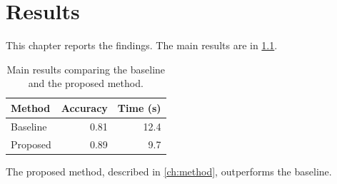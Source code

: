 \chapter{Results}
\label{ch:results}

This chapter reports the findings. The main results are in \cref{tab:results-main}.

\begin{table}[ht]
  \centering
  \begin{tabular}{lrr}
    \toprule
    Method & Accuracy & Time (s) \\
    \midrule
    Baseline & 0.81 & 12.4 \\
    Proposed & 0.89 &  9.7 \\
    \bottomrule
  \end{tabular}
  \caption{Main results comparing the baseline and the proposed method.}
  \label{tab:results-main}
\end{table}

The proposed method, described in \cref{ch:method}, outperforms the baseline.
